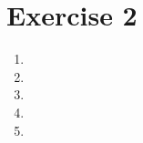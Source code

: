 \documentclass[leqno]{article}
\begin{document}
\section*{Exercise 2}
\begin{enumerate}

	\item

	\item

	\item

	\item

	\item

\end{enumerate}
\end{document}
